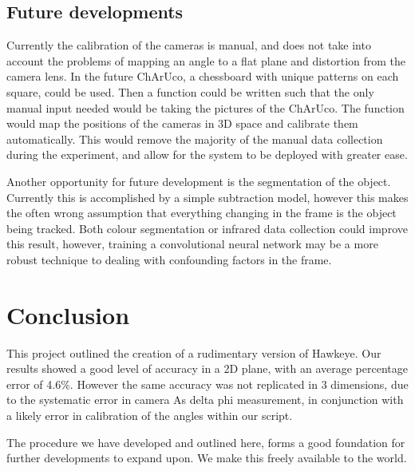 \documentclass{article}
\begin{document}
\subsection{Future developments}
Currently the calibration of the cameras is manual, and does not take into account the problems of mapping an angle to a flat plane and distortion from the camera lens. In the future ChArUco, a chessboard with unique patterns on each square, could be used. Then a function could be written such that the only manual input needed would be taking the pictures of the ChArUco. The function would map the positions of the cameras in 3D space and calibrate them automatically. This would remove the majority of the manual data collection during the experiment, and allow for the system to be deployed with greater ease. 

Another opportunity for future development is the segmentation of the object. Currently this is accomplished by a simple subtraction model, however this makes the often wrong assumption that everything changing in the frame is the object being tracked. Both colour segmentation or infrared data collection could improve this result, however, training a convolutional neural network may be a more robust technique to dealing with confounding factors in the frame.\cite{CNN} 


\section{Conclusion}
This project outlined the creation of a rudimentary version of Hawkeye. Our results showed a good level of accuracy in a 2D plane, with an average percentage error of 4.6\%. However the same accuracy was not replicated in 3 dimensions, due to the systematic error in camera As delta phi measurement, in conjunction with a likely error in calibration of the angles within our script. 

The procedure we have developed and outlined here, forms a good foundation for further developments to expand upon. We make this freely available to the world. 
\end{document}
